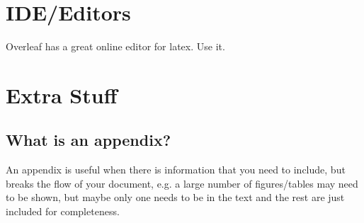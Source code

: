 \documentclass[a4paper,twoside,12pt]{report}
\begin{document}
\chapter{IDE/Editors}
Overleaf has a great online editor for latex. Use it. 

\appendix
\chapter{Extra Stuff}\label{app:extra}
\section{What is an appendix?}\label{app:whatis}

An appendix is useful when there is information that you need to include, but breaks the flow of your document, e.g. a large number of figures/tables may need to be shown, but maybe only one needs to be in the text and the rest are just included for completeness.

\nocite{*}

\end{document}
